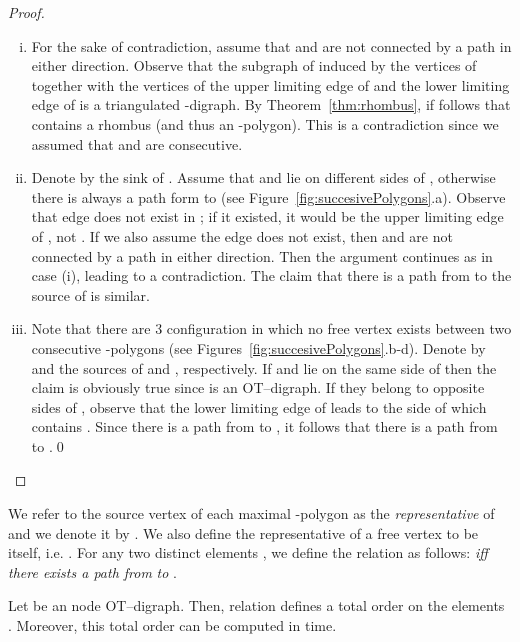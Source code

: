 \documentclass{myllncs-mixalis}
\begin{document}
\begin{proof}
\\\vspace*{-1.0cm}
\begin{enumerate}[(i)]
\item
For the sake of contradiction, assume that  and  are not
connected by a path in either direction. Observe that the subgraph
 of  induced by the vertices of  together with  the
vertices of the   upper limiting edge of  and the lower
limiting edge of  is a triangulated -digraph. By
Theorem~\ref{thm:rhombus}, if follows that  contains a rhombus
(and thus an -polygon). This is a contradiction since we assumed
that  and  are consecutive.

\item Denote by  the sink of . Assume that  and  lie on different sides of , otherwise there is
always a path form  to  (see
Figure~\ref{fig:succesivePolygons}.a). Observe that edge 
does not exist in ; if it existed, it would be the upper limiting
edge of , not . If we also assume the edge 
does not exist, then  and  are not connected by a path in
either direction. Then the argument continues as in case (i),
leading to a contradiction. The claim that there is a path from 
to the source  of  is similar.

\item Note that there are 3 configuration  in which no free vertex exists between two consecutive
-polygons (see Figures~\ref{fig:succesivePolygons}.b-d). Denote
by  and  the sources of  and , respectively. If
 and  lie on the same side of  then the claim is
obviously true since  is an OT--digraph. If they belong to
opposite sides of , observe that the lower limiting edge
 of  leads to the side of  which contains .
Since there is a path from  to , it follows that there is a
path from  to .\qed
\end{enumerate}
\end{proof}


We refer to the source vertex  of each maximal -polygon
 as the
\emph{representative} of  and we denote it by . We also
define the representative of a free vertex  to
be  itself, i.e. . For any two distinct elements , we define the  relation
 as follows: \emph{ iff there exists a path
from}   \emph{to} .

\begin{lemma}
\label{lem:totalOrder}
 Let  be an  node OT--digraph. Then,
relation  defines a total order on the elements
. Moreover, this total order can
be computed in  time.
\end{lemma}
\end{document}
